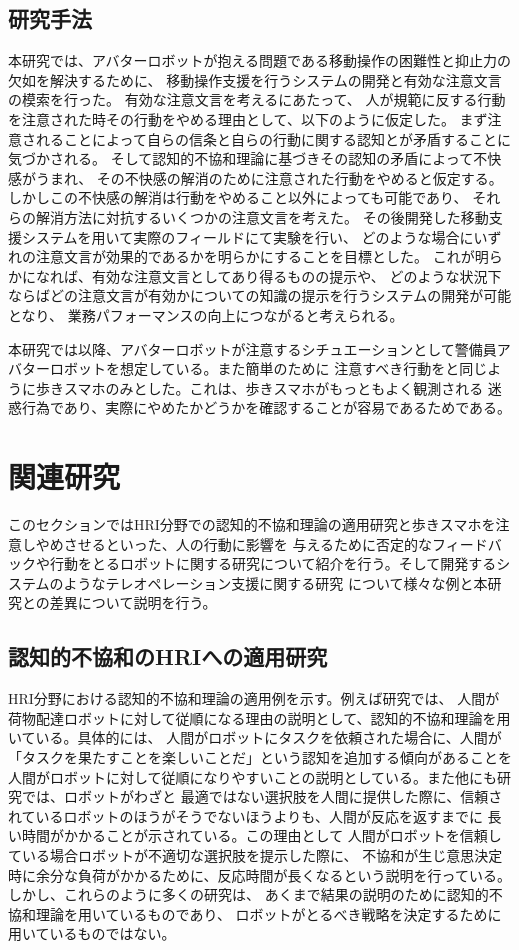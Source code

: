 \documentclass{kuisthesis}
\begin{document}
\subsection{研究手法}
\label{sec: 研究目的}
本研究では、アバターロボットが抱える問題である移動操作の困難性と抑止力の欠如を解決するために、
移動操作支援を行うシステムの開発と有効な注意文言の模索を行った。
有効な注意文言を考えるにあたって、
人が規範に反する行動を注意された時その行動をやめる理由として、以下のように仮定した。
まず注意されることによって自らの信条と自らの行動に関する認知とが矛盾することに気づかされる。
そして認知的不協和理論\cite{Festinger1957}に基づきその認知の矛盾によって不快感がうまれ、
その不快感の解消のために注意された行動をやめると仮定する。
しかしこの不快感の解消は行動をやめること以外によっても可能であり、
それらの解消方法に対抗するいくつかの注意文言を考えた。
その後開発した移動支援システムを用いて実際のフィールドにて実験を行い、
どのような場合にいずれの注意文言が効果的であるかを明らかにすることを目標とした。
これが明らかになれば、有効な注意文言としてあり得るものの提示や、
どのような状況下ならばどの注意文言が有効かについての知識の提示を行うシステムの開発が可能となり、
業務パフォーマンスの向上につながると考えられる。


本研究では以降、アバターロボットが注意するシチュエーションとして警備員アバターロボットを想定している。また簡単のために
注意すべき行動を\cite{Schneider2022,Mizumaru2019}と同じように歩きスマホのみとした。これは、歩きスマホがもっともよく観測される
迷惑行為であり、実際にやめたかどうかを確認することが容易であるためである。



\section{関連研究}
このセクションではHRI分野での認知的不協和理論の適用研究と歩きスマホを注意しやめさせるといった、人の行動に影響を
与えるために否定的なフィードバックや行動をとるロボットに関する研究について紹介を行う。そして開発するシステムのようなテレオペレーション支援に関する研究
について様々な例と本研究との差異について説明を行う。
\subsection{認知的不協和のHRIへの適用研究}
HRI分野における認知的不協和理論の適用例を示す。例えば研究\cite{washburn2022exploring}では、
人間が荷物配達ロボットに対して従順になる理由の説明として、認知的不協和理論を用いている。具体的には、
人間がロボットにタスクを依頼された場合に、人間が「タスクを果たすことを楽しいことだ」という認知を追加する傾向があることを
人間がロボットに対して従順になりやすいことの説明としている。また他にも研究\cite{herse2018you}では、ロボットがわざと
最適ではない選択肢を人間に提供した際に、信頼されているロボットのほうがそうでないほうよりも、人間が反応を返すまでに
長い時間がかかることが示されている。この理由として
人間がロボットを信頼している場合ロボットが不適切な選択肢を提示した際に、
不協和が生じ意思決定時に余分な負荷がかかるために、反応時間が長くなるという説明を行っている。
しかし、これらのように多くの研究は、
あくまで結果の説明のために認知的不協和理論を用いているものであり、
ロボットがとるべき戦略を決定するために用いているものではない。
\end{document}
